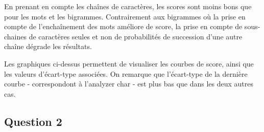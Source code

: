\documentclass[11pt]{article}
\begin{document}
En prenant en compte les chaînes de caractères, les scores sont moins
bons que pour les mots et les bigrammes. Contrairement aux bigrammes où
la prise en compte de l'enchaînement des mots améliore de score, la
prise en compte de sous-chaines de caractères seules et non de
probabilités de succession d'une autre chaîne dégrade les résultats.

    Les graphiques ci-dessus permettent de visualiser les courbes de score,
ainsi que les valeurs d'écart-type associées. On remarque que
l'écart-type de la dernière courbe - correspondont à l'analyzer char -
est plus bas que dans les deux autres cas.

    \subsection{Question 2}\label{question-2}
\end{document}
